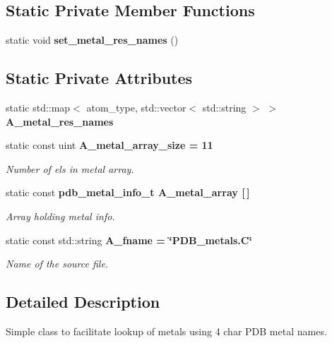 \subsection*{Static Private Member Functions}
\begin{CompactItemize}
\item 
static void \textbf{set\_\-metal\_\-res\_\-names} ()\label{classSimSite3D_1_1PDB__metals_4ffdb3ab19bc7e0cada024aad6a67e4f}

\end{CompactItemize}
\subsection*{Static Private Attributes}
\begin{CompactItemize}
\item 
static std::map$<$ atom\_\-type, std::vector$<$ std::string $>$ $>$ \textbf{A\_\-metal\_\-res\_\-names}\label{classSimSite3D_1_1PDB__metals_fa89d3ce277a4a989980b06aeaacea34}

\item 
static const uint \bf{A\_\-metal\_\-array\_\-size} = 11\label{classSimSite3D_1_1PDB__metals_c28f7415de1f2b6dec44ff26bd6698a1}

\begin{CompactList}\small\item\em Number of els in metal array. \item\end{CompactList}\item 
static const \bf{pdb\_\-metal\_\-info\_\-t} \bf{A\_\-metal\_\-array} [$\,$]
\begin{CompactList}\small\item\em Array holding metal info. \item\end{CompactList}\item 
static const std::string \bf{A\_\-fname} = \char`\"{}PDB\_\-metals.C\char`\"{}\label{classSimSite3D_1_1PDB__metals_04a5ba744abde48e1a57da373dd6d1d2}

\begin{CompactList}\small\item\em Name of the source file. \item\end{CompactList}\end{CompactItemize}


\subsection{Detailed Description}
Simple class to facilitate lookup of metals using 4 char PDB metal names. 



